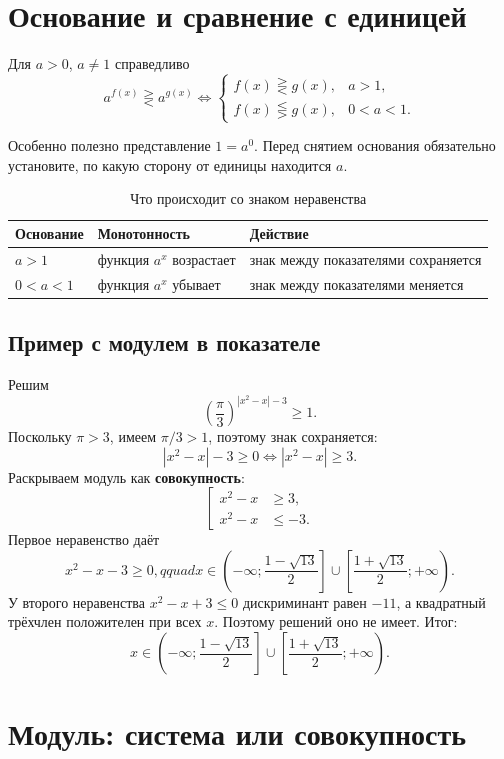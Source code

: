 \documentclass[a4paper,12pt]{article}
\newcommand{\key}[1]{\textcolor{accent}{\textbf{#1}}}
\begin{document}
\section{Основание и сравнение с единицей}

Для $a>0$, $a\ne1$ справедливо
\[
 a^{f(x)}\gtreqless a^{g(x)}
 \iff
 \begin{cases}
 f(x)\gtreqless g(x),&a>1,\\
 f(x)\lesseqgtr g(x),&0<a<1.
 \end{cases}
\]

Особенно полезно представление $1=a^0$. Перед снятием основания обязательно установите, по какую сторону от единицы находится $a$.

\begin{table}[ht]
\centering
\caption{Что происходит со знаком неравенства}
\begin{tabularx}{\linewidth}{>{\bfseries}p{31mm} X X}
\toprule
Основание & Монотонность & Действие \\
\midrule
$a>1$ & функция $a^x$ возрастает & знак между показателями сохраняется \\
$0<a<1$ & функция $a^x$ убывает & знак между показателями меняется \\
\bottomrule
\end{tabularx}
\end{table}

\subsection{Пример с модулем в показателе}

Решим
\[
\left(\frac{\pi}{3}\right)^{|x^2-x|-3}\ge1.
\]
Поскольку $\pi>3$, имеем $\pi/3>1$, поэтому знак сохраняется:
\[
|x^2-x|-3\ge0\iff |x^2-x|\ge3.
\]
Раскрываем модуль как \key{совокупность}:
\[
\left[
\begin{aligned}
x^2-x&\ge3,\\
x^2-x&\le-3.
\end{aligned}
\right.
\]
Первое неравенство даёт
\[
x^2-x-3\ge0,qquad
x\in\left(-\infty;\frac{1-\sqrt{13}}2\right]
\cup
\left[\frac{1+\sqrt{13}}2;+\infty\right).
\]
У второго неравенства $x^2-x+3\le0$ дискриминант равен $-11$, а квадратный трёхчлен положителен при всех $x$. Поэтому решений оно не имеет. Итог:
\[
\boxed{x\in\left(-\infty;\frac{1-\sqrt{13}}2\right]
\cup
\left[\frac{1+\sqrt{13}}2;+\infty\right)}.
\]

\section{Модуль: система или совокупность}
\end{document}
